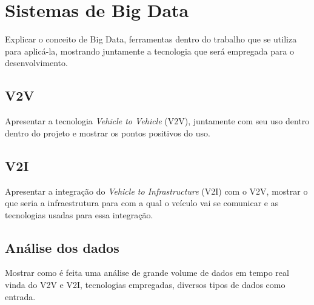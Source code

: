 \chapter{Sistemas de Big Data}
\label{chap:bigdata}
Explicar o conceito de Big Data, ferramentas dentro do trabalho que se utiliza para aplicá-la, mostrando juntamente a tecnologia que será empregada para o desenvolvimento.

\section{V2V}
\label{sec:v2v}
Apresentar a tecnologia \textit{Vehicle to Vehicle} (V2V), juntamente com seu uso dentro dentro do projeto e mostrar os pontos positivos do uso.

\section{V2I}
\label{sec:v2i}
Apresentar a integração do \textit{Vehicle to Infrastructure} (V2I) com o V2V, mostrar o que seria a infraestrutura para com a qual o veículo vai se comunicar e as tecnologias usadas para essa integração.

\section{Análise dos dados}
\label{sec:analisedados}
Mostrar como é feita uma análise de grande volume de dados em tempo real vinda do V2V e V2I, tecnologias empregadas, diversos tipos de dados como entrada.


 